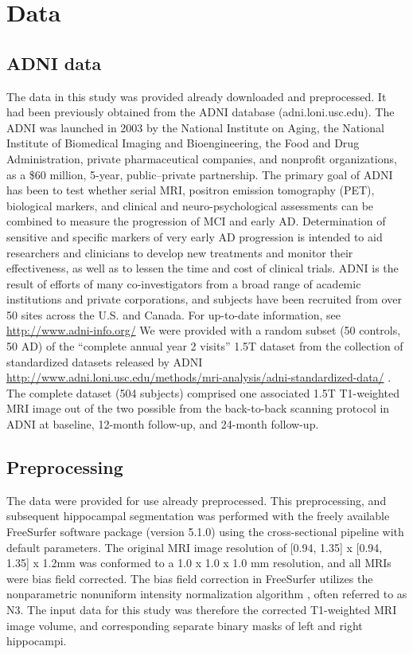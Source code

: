 \chapter{Data}

\section{ADNI data}
The data in this study was provided already downloaded and preprocessed. It had been previously obtained from the ADNI database (adni.loni.usc.edu). The ADNI was launched in 2003 by the National Institute on Aging, the National Institute of Biomedical Imaging and Bioengineering, the Food and Drug Administration, private pharmaceutical companies, and nonprofit organizations, as a \$60 million, 5-year, public–private partnership. The primary goal of ADNI has been to test whether serial MRI, positron emission tomography (PET), biological markers, and clinical and neuro-psychological assessments can be combined to measure the progression of MCI and early AD. Determination of sensitive and specific markers of very early AD progression is intended to aid researchers and clinicians to develop new treatments and monitor their effectiveness, as well as to lessen the time and cost of clinical trials. ADNI is the result of efforts of many co-investigators from a broad range of academic institutions and private corporations, and subjects have been recruited from over 50 sites across the U.S. and Canada. For up-to-date information, see \href{http://www.adni-info.org/}{http://www.adni-info.org/}
We were provided with a random subset (50 controls, 50 AD) of the “complete annual year 2 visits” 1.5T dataset from the collection of standardized datasets released by ADNI \href{http://www.adni.loni.usc.edu/methods/mri-analysis/adni-standardized-data/}{http://www.adni.loni.usc.edu/methods/mri-analysis/adni-standardized-data/} \cite{wyman2013standardization}. The complete dataset (504 subjects) comprised one associated 1.5T T1-weighted MRI image out of the two possible from the back-to-back scanning protocol in ADNI \cite{jack2008alzheimer} at baseline, 12-month follow-up, and 24-month follow-up.

\section{Preprocessing}
The data were provided for use already preprocessed. This preprocessing, and subsequent hippocampal segmentation was performed with the freely available FreeSurfer software package (version 5.1.0) \cite{fischl2002whole} using the cross-sectional pipeline with default parameters. The original MRI image resolution of [0.94, 1.35] x [0.94, 1.35] x 1.2mm was conformed to a 1.0 x 1.0 x 1.0 mm resolution, and all MRIs were bias field corrected. The bias field correction in FreeSurfer utilizes the nonparametric nonuniform intensity normalization algorithm \cite{sled1998nonparametric}, often referred to as N3. The input data for this study was therefore the corrected T1-weighted MRI image volume, and corresponding separate binary masks of left and right hippocampi. 